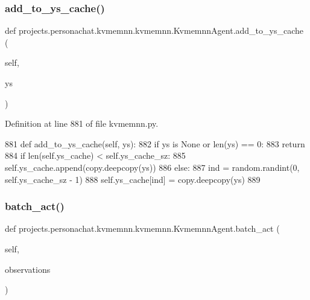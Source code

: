 \subsubsection{\texorpdfstring{add\+\_\+to\+\_\+ys\+\_\+cache()}{add\_to\_ys\_cache()}}
{\footnotesize\ttfamily def projects.\+personachat.\+kvmemnn.\+kvmemnn.\+Kvmemnn\+Agent.\+add\+\_\+to\+\_\+ys\+\_\+cache (\begin{DoxyParamCaption}\item[{}]{self,  }\item[{}]{ys }\end{DoxyParamCaption})}



Definition at line 881 of file kvmemnn.\+py.


\begin{DoxyCode}
881     \textcolor{keyword}{def }add\_to\_ys\_cache(self, ys):
882         \textcolor{keywordflow}{if} ys \textcolor{keywordflow}{is} \textcolor{keywordtype}{None} \textcolor{keywordflow}{or} len(ys) == 0:
883             \textcolor{keywordflow}{return}
884         \textcolor{keywordflow}{if} len(self.ys\_cache) < self.ys\_cache\_sz:
885             self.ys\_cache.append(copy.deepcopy(ys))
886         \textcolor{keywordflow}{else}:
887             ind = random.randint(0, self.ys\_cache\_sz - 1)
888             self.ys\_cache[ind] = copy.deepcopy(ys)
889 
\end{DoxyCode}
\mbox{\label{classprojects_1_1personachat_1_1kvmemnn_1_1kvmemnn_1_1KvmemnnAgent_afded126c755a6cf5401a99f88f0799f9}} 
\subsubsection{\texorpdfstring{batch\+\_\+act()}{batch\_act()}}
{\footnotesize\ttfamily def projects.\+personachat.\+kvmemnn.\+kvmemnn.\+Kvmemnn\+Agent.\+batch\+\_\+act (\begin{DoxyParamCaption}\item[{}]{self,  }\item[{}]{observations }\end{DoxyParamCaption})}



